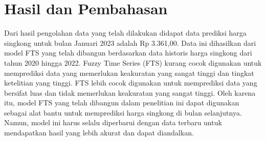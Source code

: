 \documentclass[conference]{IEEEtran}
\begin{document}
\section{Hasil dan Pembahasan}
Dari hasil pengolahan data yang telah dilakukan didapat data prediksi harga singkong untuk bulan Januari 2023 adalah Rp 3.361,00. Data ini dihasilkan dari model FTS yang telah dibangun berdasarkan data historis harga singkong dari tahun 2020 hingga 2022.
Fuzzy Time Series (FTS) kurang cocok digunakan untuk memprediksi data yang memerlukan keakuratan yang sangat tinggi dan tingkat ketelitian yang tinggi. FTS lebih cocok digunakan untuk memprediksi data yang bersifat luas dan tidak memerlukan keakuratan yang sangat tinggi. Oleh karena itu, model FTS yang telah dibangun dalam penelitian ini dapat digunakan sebagai alat bantu untuk memprediksi harga singkong di bulan selanjutnya. Namun, model ini harus selalu diperbarui dengan data terbaru untuk mendapatkan hasil yang lebih akurat dan dapat diandalkan.
\end{document}

